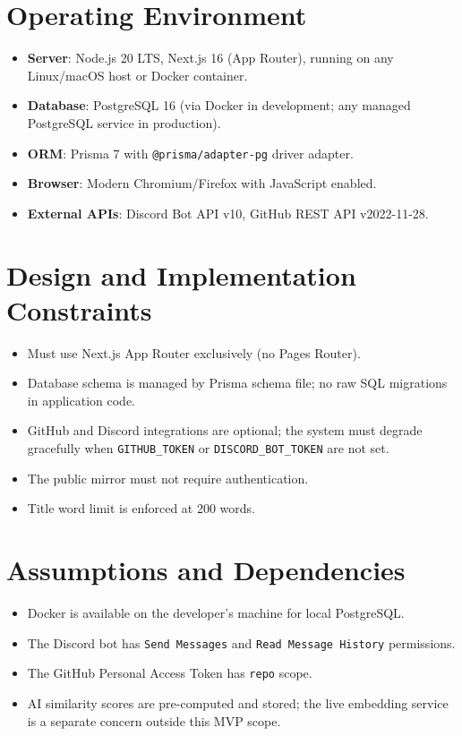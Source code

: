 \documentclass[12pt,a4paper]{report}
\begin{document}
\section{Operating Environment}
\begin{itemize}
  \item \textbf{Server}: Node.js 20 LTS, Next.js 16 (App Router), running on
    any Linux/macOS host or Docker container.
  \item \textbf{Database}: PostgreSQL 16 (via Docker in development; any
    managed PostgreSQL service in production).
  \item \textbf{ORM}: Prisma 7 with \texttt{@prisma/adapter-pg} driver adapter.
  \item \textbf{Browser}: Modern Chromium/Firefox with JavaScript enabled.
  \item \textbf{External APIs}: Discord Bot API v10, GitHub REST API v2022-11-28.
\end{itemize}

\section{Design and Implementation Constraints}
\begin{itemize}
  \item Must use Next.js App Router exclusively (no Pages Router).
  \item Database schema is managed by Prisma schema file; no raw SQL migrations
    in application code.
  \item GitHub and Discord integrations are optional; the system must degrade
    gracefully when \texttt{GITHUB\_TOKEN} or \texttt{DISCORD\_BOT\_TOKEN} are
    not set.
  \item The public mirror must not require authentication.
  \item Title word limit is enforced at 200 words.
\end{itemize}

\section{Assumptions and Dependencies}
\begin{itemize}
  \item Docker is available on the developer's machine for local PostgreSQL.
  \item The Discord bot has \texttt{Send Messages} and
    \texttt{Read Message History} permissions.
  \item The GitHub Personal Access Token has \texttt{repo} scope.
  \item AI similarity scores are pre-computed and stored; the live embedding
    service is a separate concern outside this MVP scope.
\end{itemize}
\end{document}
